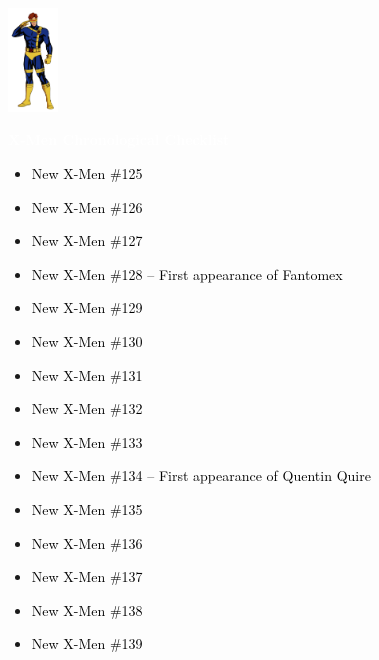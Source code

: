 \documentclass[12pt]{article}
\newcommand{\checkbox}{\raisebox{0.0ex}{\fbox{\rule{0ex}{1.5ex} \rule{1.5ex}{0ex}}}}
\begin{document}
\begin{center}
    \vspace*{2cm}
    \includegraphics[width=0.1\textwidth]{cyclops.png}
    \vspace{0.3cm}

    {\Huge \textbf{\textcolor{white}{X-Men Chronological Checklist}}}
\end{center}

\vspace{0.3cm}
\noindent
\begin{tcolorbox}[
  colback=white!95!gray,
  colframe=black,
  width=\textwidth,
  arc=4mm,
  auto outer arc,
  boxrule=0.8pt,
  left=8pt,right=8pt,top=8pt,bottom=8pt
]
\begin{itemize}[left=0pt,label={\checkbox}]
  \item \textcolor{black}{New X-Men \#125}
  \item \textcolor{black}{New X-Men \#126}
  \item \textcolor{black}{New X-Men \#127}
  \item \textcolor{black}{New X-Men \#128 – First appearance of Fantomex}
  \item \textcolor{black}{New X-Men \#129}
  \item \textcolor{black}{New X-Men \#130}
  \item \textcolor{black}{New X-Men \#131}
  \item \textcolor{black}{New X-Men \#132}
  \item \textcolor{black}{New X-Men \#133}
  \item \textcolor{black}{New X-Men \#134 – First appearance of Quentin Quire}
  \item \textcolor{black}{New X-Men \#135}
  \item \textcolor{black}{New X-Men \#136}
  \item \textcolor{black}{New X-Men \#137}
  \item \textcolor{black}{New X-Men \#138}
  \item \textcolor{black}{New X-Men \#139}
\end{itemize}
\end{tcolorbox}
\end{document}

